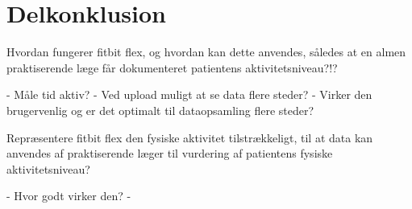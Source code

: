 \section{Delkonklusion}

Hvordan fungerer fitbit flex, og hvordan kan dette anvendes, således at en almen praktiserende læge får dokumenteret patientens aktivitetsniveau?!?

- Måle tid aktiv?
- Ved upload muligt at se data flere steder?
- Virker den brugervenlig og er det optimalt til dataopsamling flere steder?

Repræsentere fitbit flex den fysiske aktivitet tilstrækkeligt, til at data kan anvendes af praktiserende læger til vurdering af patientens fysiske aktivitetsniveau?

- Hvor godt virker den?
- 